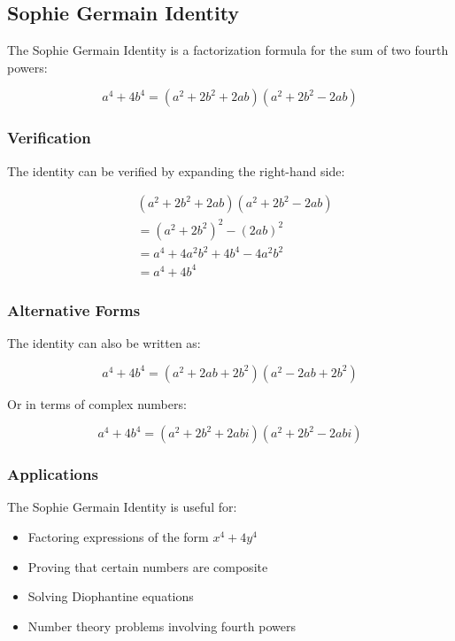 \subsection{Sophie Germain Identity}

The Sophie Germain Identity is a factorization formula for the sum of two fourth powers:

\begin{equation}
    a^4 + 4b^4 = (a^2 + 2b^2 + 2ab)(a^2 + 2b^2 - 2ab)
\end{equation}

\subsubsection{Verification}

The identity can be verified by expanding the right-hand side:

\begin{align*}
    &(a^2 + 2b^2 + 2ab)(a^2 + 2b^2 - 2ab) \\
    &= (a^2 + 2b^2)^2 - (2ab)^2 \\
    &= a^4 + 4a^2b^2 + 4b^4 - 4a^2b^2 \\
    &= a^4 + 4b^4
\end{align*}

\subsubsection{Alternative Forms}

The identity can also be written as:

\begin{equation}
    a^4 + 4b^4 = (a^2 + 2ab + 2b^2)(a^2 - 2ab + 2b^2)
\end{equation}

Or in terms of complex numbers:

\begin{equation}
    a^4 + 4b^4 = (a^2 + 2b^2 + 2abi)(a^2 + 2b^2 - 2abi)
\end{equation}

\subsubsection{Applications}

The Sophie Germain Identity is useful for:

\begin{itemize}
    \item Factoring expressions of the form $x^4 + 4y^4$
    \item Proving that certain numbers are composite
    \item Solving Diophantine equations
    \item Number theory problems involving fourth powers
\end{itemize}
